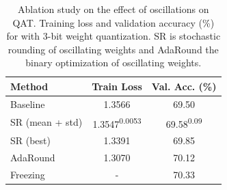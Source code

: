 \begin{table}[t]
    \centering
    \begin{tabular}{ l | c  c }
    \toprule
  Method & Train Loss & Val. Acc. (\%) \\
        \midrule
Baseline         & 1.3566  & 69.50 \\
\midrule
SR (mean + std)  & 1.3547\textsuperscript{0.0053}  & 69.58\textsuperscript{0.09} \\
SR (best)        & 1.3391  & 69.85 \\
AdaRound  & 1.3070  & 70.12 \\
\midrule
Freezing & -  & 70.33 \\
\bottomrule
\end{tabular}
 \caption{Ablation study on the effect of oscillations on QAT. Training loss and validation accuracy (\%) for  with 3-bit weight quantization. SR is stochastic rounding of oscillating weights and AdaRound the binary optimization of oscillating weights.}
\vspace{-.1cm}
 \label{tbl:binary_post_opt}
\end{table}